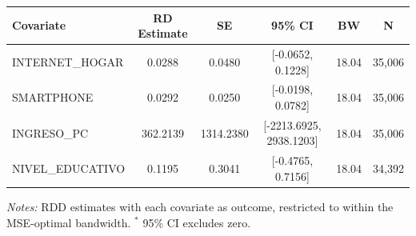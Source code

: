 \begin{threeparttable}
\begin{tabular}{l ccccc}
\toprule
Covariate & RD Estimate & SE & 95\% CI & BW & N \\
\midrule
  INTERNET\_HOGAR & 0.0288 & 0.0480 & [-0.0652, 0.1228] & 18.04 & 35{,}006 \\
  SMARTPHONE & 0.0292 & 0.0250 & [-0.0198, 0.0782] & 18.04 & 35{,}006 \\
  INGRESO\_PC & 362.2139 & 1314.2380 & [-2213.6925, 2938.1203] & 18.04 & 35{,}006 \\
  NIVEL\_EDUCATIVO & 0.1195 & 0.3041 & [-0.4765, 0.7156] & 18.04 & 34{,}392 \\
\bottomrule
\end{tabular}
\begin{tablenotes}
\small
\item \textit{Notes:} RDD estimates with each covariate as outcome, restricted to within the MSE-optimal bandwidth. $^{*}$ 95\% CI excludes zero.
\end{tablenotes}
\end{threeparttable}